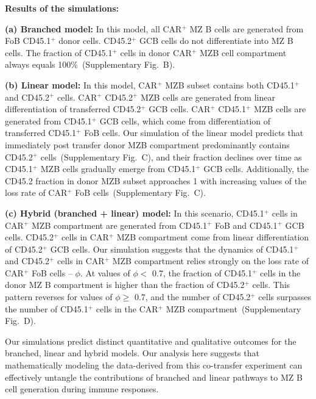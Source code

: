 \documentclass[11pt]{article}
\newcommand{\red}[1]{{\color{red}{#1}}}
\begin{document}
\textbf{Results of the simulations:}

\textbf{(a) Branched model:}
In this model, all CAR$^{+}$  MZ B cells are generated from FoB CD45.1$^{+}$ donor cells.
CD45.2$^{+}$ GCB cells do not differentiate into MZ B cells.
The fraction of CD45.1$^{+}$ cells in donor CAR$^{+}$ MZB cell compartment always equals 100\%~(Supplementary Fig.~\red{XX}B).

\textbf{(b) Linear model:}
In this model, CAR$^{+}$ MZB subset contains both CD45.1$^{+}$ and CD45.2$^{+}$ cells.
CAR$^{+}$ CD45.2$^{+}$ MZB cells are generated from linear differentiation of transferred CD45.2$^{+}$ GCB cells.
CAR$^{+}$ CD45.1$^{+}$ MZB cells are generated from CD45.1$^{+}$ GCB cells, which come from differentiation of transferred CD45.1$^{+}$ FoB cells.
Our simulation of the linear model predicts that immediately post transfer donor MZB compartment predominantly contains CD45.2$^{+}$ cells~(Supplementary Fig.~\red{XX}C), and their fraction declines over time as CD45.1$^{+}$ MZB cells gradually emerge from CD45.1$^{+}$ GCB cells. 
Additionally, the CD45.2 fraction in donor MZB subset approaches 1 with increasing values of the loss rate of CAR$^{+}$ FoB cells~(Supplementary Fig.~\red{XX}C). 


\textbf{(c) Hybrid (branched + linear) model:}
In this scenario, CD45.1$^{+}$ cells in CAR$^{+}$ MZB compartment are generated from CD45.1$^{+}$ FoB and CD45.1$^{+}$ GCB cells.  %
CD45.2$^{+}$ cells in CAR$^{+}$  MZB compartment come from linear differentiation of CD45.2$^{+}$ GCB cells.
Our simulation suggests that the dynamics of CD45.1$^{+}$ and CD45.2$^{+}$ cells in CAR$^{+}$ MZB compartment relies strongly on the loss rate of CAR$^{+}$ FoB cells --  $\phi$.
At values of $\phi <$ 0.7, the fraction of CD45.1$^{+}$ cells in the donor MZ B compartment is higher than the fraction of CD45.2$^{+}$ cells.
This pattern reverses for values of $\phi \ge$ 0.7, and the number of CD45.2$^{+}$ cells surpasses the number of  CD45.1$^{+}$ cells in the CAR$^{+}$  MZB compartment~(Supplementary Fig.~\red{XX}D).

Our simulations predict distinct quantitative and qualitative outcomes for the branched, linear and hybrid models.
Our analysis here suggests that mathematically modeling the data-derived from this co-transfer experiment can effectively untangle the contributions of branched and linear pathways to MZ B cell generation during immune responses.
\end{document}
